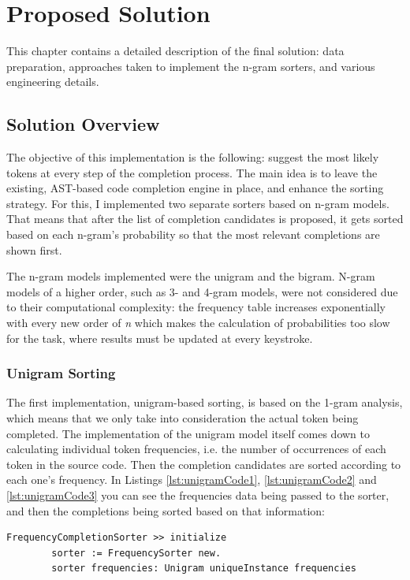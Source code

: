 \chapter{Proposed Solution}
\label{chap:ProposedSolution}

This chapter contains a detailed description of the final solution: data preparation, approaches taken to implement the n-gram sorters, and various engineering details.

\section{Solution Overview}
\label{sec:ProposedSolution-Overview}
The objective of this implementation is the following: suggest the most likely tokens at every step of the completion process. The main idea is to leave the existing, AST-based code completion engine in place, and enhance the sorting strategy. For this, I implemented two separate sorters based on n-gram models. That means that after the list of completion candidates is proposed, it gets sorted based on each n-gram's probability so that the most relevant completions are shown first.

The n-gram models implemented were the unigram and the bigram. N-gram models of a higher order, such as 3- and 4-gram models, were not considered due to their computational complexity: the frequency table increases exponentially with every new order of \textit{n} which makes the calculation of probabilities too slow for the task, where results must be updated at every keystroke.

\subsection{Unigram Sorting}
The first implementation, unigram-based sorting, is based on the 1-gram analysis, which means that we only take into consideration the actual token being completed. The implementation of the unigram model itself comes down to calculating individual token frequencies, i.e. the number of occurrences of each token in the source code. Then the completion candidates are sorted according to each one's frequency. In Listings \ref{lst:unigramCode1}, \ref{lst:unigramCode2} and \ref{lst:unigramCode3}  you can see the frequencies data being passed to the sorter, and then the completions being sorted based on that information:

\begin{lstlisting}[caption={The unigram sorter implementation: passing the frequencies to the sorter}, label={lst:unigramCode1}]
    FrequencyCompletionSorter >> initialize
        sorter := FrequencySorter new.
        sorter frequencies: Unigram uniqueInstance frequencies
\end{lstlisting}

